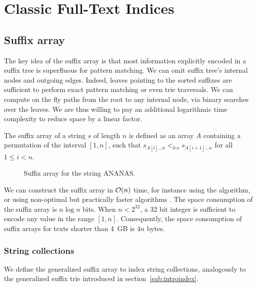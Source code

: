 \section{Classic Full-Text Indices}

\subsection{Suffix array}

The key idea of the suffix array \citep{Manber1990} is that most information explicitly encoded in a suffix tree is superfluous for pattern matching.
We can omit suffix tree's internal nodes and outgoing edges.
Indeed, leaves pointing to the sorted suffixes are sufficient to perform exact pattern matching or even trie traversals.
We can compute on the fly paths from the root to any internal node, via binary searches over the leaves.
We are thus willing to pay an additional logarithmic time complexity to reduce space by a linear factor.

\begin{definition}
The suffix array of a string $s$ of length $n$ is defined as an array $A$ containing a permutation of the interval $[1,n]$, such that $s_{A[i] \dots n} <_{lex} s_{A[i+1] \dots n}$ for all $1 \leq i < n$.
\end{definition}

\begin{figure}[h]
\caption{Suffix array for the string ANANAS.}
\label{fig:sa}
\begin{center}
\end{center}
\end{figure}

We can construct the suffix array in $\mathcal{O}(n)$ time, for instance using the \citep{Karkkainen2003} algorithm, or using non-optimal but practically faster algorithms \citep{?}.
The space consumption of the suffix array is $n \log{n}$ bits.
When $n < 2^{32}$, a 32 bit integer is sufficient to encode any value in the range $[1,n]$.
Consequently, the space consumption of suffix arrays for texts shorter than 4~GB is $4 n$ bytes.

\subsubsection{String collections}

We define the generalized suffix array to index string collections, analogously to the generalized suffix trie introduced in section~\ref{sub:introindex}.


